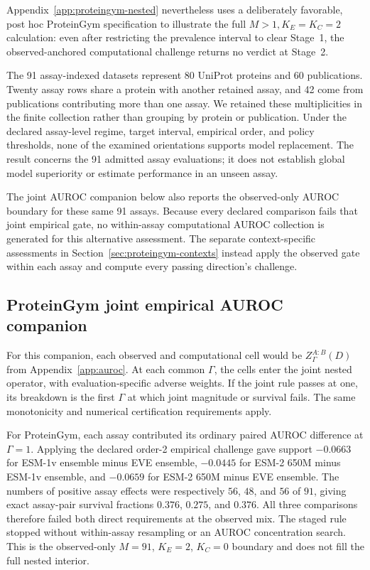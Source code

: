 \documentclass[11pt]{article}
\theoremstyle{remark}
\begin{document}
Appendix~\ref{app:proteingym-nested} nevertheless uses a deliberately
favorable, post hoc ProteinGym specification to illustrate the full
$M>1,K_E=K_C=2$ calculation: even after restricting the prevalence interval
to clear Stage~1, the observed-anchored computational challenge returns no
verdict at Stage~2.

The 91 assay-indexed datasets represent 80 UniProt proteins and 60
publications. Twenty assay rows share a protein with another retained assay,
and 42 come from publications contributing more than one assay. We retained
these multiplicities in the finite collection rather than grouping by protein
or publication. Under the declared assay-level regime, target interval,
empirical order, and policy thresholds, none of the examined orientations
supports model replacement. The result concerns the 91 admitted assay
evaluations; it does not establish global model superiority or estimate
performance in an unseen assay.

The joint AUROC companion below also reports the observed-only AUROC
boundary for these same 91 assays. Because every declared comparison fails
that joint empirical gate, no within-assay computational AUROC collection is
generated for this alternative assessment. The separate context-specific
assessments in Section~\ref{sec:proteingym-contexts} instead apply the observed
gate within each assay and compute every passing direction's challenge.


\subsection{ProteinGym joint empirical AUROC companion}
For this companion, each observed and computational cell would be
$Z_\Gamma^{A:B}(D)$ from Appendix~\ref{app:auroc}. At each common
$\Gamma$, the cells enter the joint nested operator, with evaluation-specific
adverse weights. If the joint rule passes at one, its breakdown is the first
$\Gamma$ at which joint magnitude or survival fails. The same monotonicity
and numerical certification requirements apply.

For ProteinGym, each assay contributed its ordinary paired AUROC difference at
$\Gamma=1$. Applying the declared order-2 empirical challenge gave support
$-0.0663$ for ESM-1v ensemble minus EVE ensemble, $-0.0445$ for ESM-2 650M
minus ESM-1v ensemble, and $-0.0659$ for ESM-2 650M minus EVE ensemble. The
numbers of positive assay effects were respectively $56$, $48$, and $56$ of
$91$, giving exact assay-pair survival fractions $0.376$, $0.275$, and $0.376$.
All three comparisons therefore failed both direct requirements at the
observed mix. The staged rule stopped without within-assay resampling or an
AUROC concentration search. This is the observed-only $M=91$, $K_E=2$,
$K_C=0$ boundary and does not fill the full nested interior.
\end{document}
